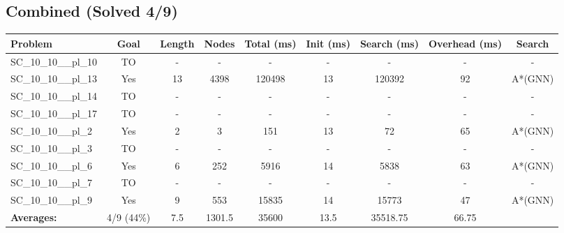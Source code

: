 \documentclass{article}
\begin{document}
\subsection*{Combined (Solved 4/9)}
\begin{tabular}{lcccccccc}
\toprule
Problem & Goal & Length & Nodes & Total (ms) & Init (ms) & Search (ms) & Overhead (ms) & Search \\
\midrule
SC\_10\_10\_\_pl\_10 & TO & - & - & - & - & - & - & - \\
SC\_10\_10\_\_pl\_13 & Yes & 13 & 4398 & 120498 & 13 & 120392 & 92 & A*(GNN) \\
SC\_10\_10\_\_pl\_14 & TO & - & - & - & - & - & - & - \\
SC\_10\_10\_\_pl\_17 & TO & - & - & - & - & - & - & - \\
SC\_10\_10\_\_pl\_2 & Yes & 2 & 3 & 151 & 13 & 72 & 65 & A*(GNN) \\
SC\_10\_10\_\_pl\_3 & TO & - & - & - & - & - & - & - \\
SC\_10\_10\_\_pl\_6 & Yes & 6 & 252 & 5916 & 14 & 5838 & 63 & A*(GNN) \\
SC\_10\_10\_\_pl\_7 & TO & - & - & - & - & - & - & - \\
SC\_10\_10\_\_pl\_9 & Yes & 9 & 553 & 15835 & 14 & 15773 & 47 & A*(GNN) \\
\textbf{Averages:} & 4/9 (44\%) & 7.5 & 1301.5 & 35600 & 13.5 & 35518.75 & 66.75 & \\
\bottomrule
\end{tabular}
\\[0.7cm]
\end{document}
